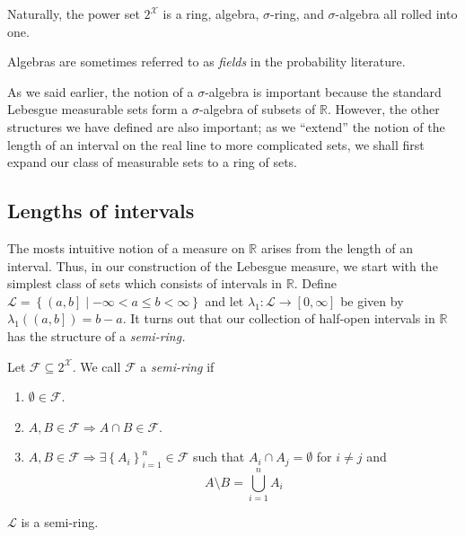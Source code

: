 \noindent Naturally, the power set $2^{\mathcal{X}}$ is a ring,
algebra, $\sigma$-ring, and $\sigma$-algebra all rolled into one.
\begin{rem*}
Algebras are sometimes referred to as \emph{fields} in the probability
literature.
\end{rem*}
As we said earlier, the notion of a $\sigma$-algebra is important
because the standard Lebesgue measurable sets form a $\sigma$-algebra
of subsets of $\mathds{R}$. However, the other structures we have
defined are also important; as we ``extend'' the notion of the length
of an interval on the real line to more complicated sets, we shall
first expand our class of measurable sets to a ring of sets.

\subsection{Lengths of intervals}

The mosts intuitive notion of a measure on $\mathds{R}$ arises from
the length of an interval. Thus, in our construction of the Lebesgue
measure, we start with the simplest class of sets which consists of
intervals in $\mathds{R}.$ Define $\mathcal{L}=\left\{ \left(a,b\right]\mid-\infty<a\leq b<\infty\right\} $
and let $\lambda_{1}:\mathcal{L}\longrightarrow\left[0,\infty\right]$
be given by $\lambda_{1}\left(\left(a,b\right]\right)=b-a$. It turns
out that our collection of half-open intervals in $\mathds{R}$ has
the structure of a \emph{semi-ring.}
\begin{defn}
\label{def:semiRing} Let $\mathcal{F}\subseteq2^{\mathcal{X}}$.
We call $\mathcal{F}$ a \emph{semi-ring }if

\begin{enumerate}[label=(\roman*),leftmargin=.1\linewidth,rightmargin=.4\linewidth]
	\item $\emptyset \in \mathcal{F}$.
	\item $A,B \in \mathcal{F} \Rightarrow A\cap B \in \mathcal{F}$.
	\item $A,B \in \mathcal{F} \Rightarrow \exists \left\{A_i\right\}_{i=1}^{n} \in \mathcal{F}$ such that $ A_i \cap A_j = \emptyset$ for $i \neq j$ and
	\[
		A \setminus B = \bigcup_{i=1}^{n}A_i 
	\]
\end{enumerate}
\end{defn}

\begin{prop}
\label{prop:intervalSigmaRing}$\mathcal{L}$ is a semi-ring.
\end{prop}

